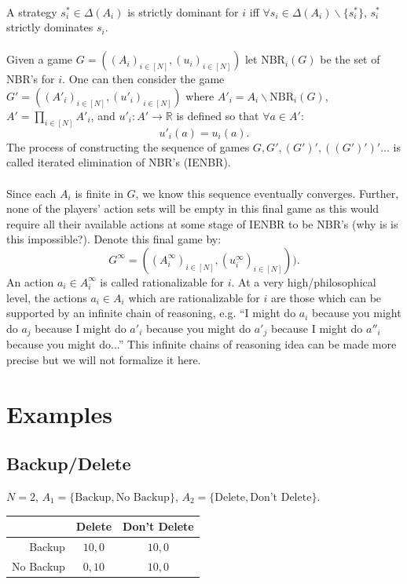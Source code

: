 \documentclass[11pt]{article}
\theoremstyle{definition}
\theoremstyle{plain}
\begin{document}
\\
A strategy $s^*_i \in \Delta(A_i)$ is strictly dominant for $i$ iff $\forall s_i \in \Delta(A_i)\backslash\{s^*_i\}$, $s^*_i$ strictly dominates $s_i$.
\\
\\
Given a game $G=((A_i)_{i \in [N]},(u_i)_{i \in [N]})$ let $\text{NBR}_i(G)$ be the set of NBR's for $i$. One can then consider the game $G'= ((A'_i)_{i \in [N]},(u'_i)_{i \in [N]})$ where $A'_i=A_i\backslash\text{NBR}_i(G)$, $A'=\prod_{i \in [N]} A'_i$, and $u'_i: A' \to \mathbb{R}$ is defined so that $\forall a \in A'$:
$$u'_i(a)=u_i(a).$$
The process of constructing the sequence of games $G,G',(G')',((G')')'...$ is called iterated elimination of NBR's (IENBR). 
\\
\\
Since each $A_i$ is finite in $G$, we know this sequence eventually converges. Further, none of the players' action sets will be empty in this final game as this would require all their available actions at some stage of IENBR to be NBR's (why is is this impossible?). Denote this final game by:
$$G^{\infty}=((A^{\infty}_i)_{i \in [N]},(u^{\infty}_i)_{i \in [N]})).$$
An action $a_i \in A^{\infty}_i$ is called rationalizable for $i$. At a very high/philosophical level, the actions $a_i \in A_i$ which are rationalizable for $i$ are those which can be supported by an infinite chain of reasoning, e.g. ``I might do $a_i$ because you might do $a_j$ because I might do $a'_i$ because you might do $a'_j$ because I might do $a''_i$ because you might do...'' This infinite chains of reasoning idea can be made more precise but we will not formalize it here.


\section{Examples}

\subsection*{Backup/Delete}

$N = 2$, $A_1 = \{\text{Backup}, \text{No Backup}\}$, $A_2 = \{\text{Delete}, \text{Don't Delete}\}$.

\begin{center}
\begin{tabular}{r|c|c|}
  & Delete & Don't Delete \\\hline
Backup & $10, 0$ & $10, 0$ \\\hline
No Backup & $0, 10$ & $10, 0$ \\\hline
\end{tabular}
\end{center}
\end{document}
